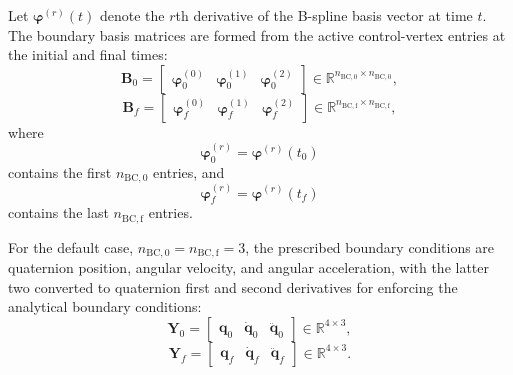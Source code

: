 Let $\boldsymbol{\varphi}^{(r)}(t)$ denote the $r$th derivative of the
B-spline basis vector at time $t$. The boundary basis matrices are formed
from the active control-vertex entries at the initial and final times:
\begin{equation}
    \mathbf{B}_0
    =
    \begin{bmatrix}
        \boldsymbol{\varphi}^{(0)}_0 &
        \boldsymbol{\varphi}^{(1)}_0 &
        \boldsymbol{\varphi}^{(2)}_0
    \end{bmatrix}
    \in
    \mathbb{R}^{n_{\mathrm{BC,0}}\times n_{\mathrm{BC,0}}},
\end{equation}
\begin{equation}
    \mathbf{B}_f
    =
    \begin{bmatrix}
        \boldsymbol{\varphi}^{(0)}_f &
        \boldsymbol{\varphi}^{(1)}_f &
        \boldsymbol{\varphi}^{(2)}_f
    \end{bmatrix}
    \in
    \mathbb{R}^{n_{\mathrm{BC,f}}\times n_{\mathrm{BC,f}}},
\end{equation}
where
\begin{equation}
    \boldsymbol{\varphi}^{(r)}_0
    =
    \boldsymbol{\varphi}^{(r)}(t_0)
\end{equation}
contains the first $n_{\mathrm{BC,0}}$ entries, and
\begin{equation}
    \boldsymbol{\varphi}^{(r)}_f
    =
    \boldsymbol{\varphi}^{(r)}(t_f)
\end{equation}
contains the last $n_{\mathrm{BC,f}}$ entries.

For the default case, $n_{\mathrm{BC,0}}=n_{\mathrm{BC,f}}=3$, the prescribed boundary
conditions are quaternion position, angular velocity, and angular acceleration, with the latter two converted to quaternion first and second derivatives for enforcing the analytical boundary conditions:
\begin{equation}
    \mathbf{Y}_0
    =
    \begin{bmatrix}
        \mathbf{q}_0 &
        \dot{\mathbf{q}}_0 &
        \ddot{\mathbf{q}}_0
    \end{bmatrix}
    \in
    \mathbb{R}^{4\times 3},
\end{equation}
\begin{equation}
    \mathbf{Y}_f
    =
    \begin{bmatrix}
        \mathbf{q}_f &
        \dot{\mathbf{q}}_f &
        \ddot{\mathbf{q}}_f
    \end{bmatrix}
    \in
    \mathbb{R}^{4\times 3}.
\end{equation}

